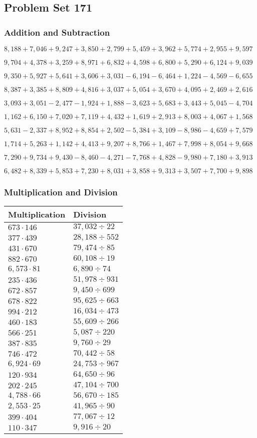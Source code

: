 \hypertarget{problem-set-171}{%
\subsection{Problem Set 171}\label{problem-set-171}}

\hypertarget{addition-and-subtraction}{%
\subsubsection{Addition and
Subtraction}\label{addition-and-subtraction}}

\(8,188+7,046+9,247+3,850+2,799+5,459+3,962+5,774+2,955+9,597\)

\(9,704+4,378+3,259+8,971+6,832+4,598+6,800+5,290+6,124+9,039\)

\(9,350+5,927+5,641+3,606+3,031-6,194-6,464+1,224-4,569-6,655\)

\(8,387+3,385+8,809+4,816+3,037+5,054+3,670+4,095+2,469+2,616\)

\(3,093+3,051-2,477-1,924+1,888-3,623+5,683+3,443+5,045-4,704\)

\(1,162+6,150+7,020+7,119+4,432+1,619+2,913+8,003+4,067+1,568\)

\(5,631-2,337+8,952+8,854+2,502-5,384+3,109-8,986-4,659+7,579\)

\(1,714+5,263+1,142+4,413+9,207+8,766+1,467+7,998+8,054+9,668\)

\(7,290+9,734+9,430-8,460-4,271-7,768+4,828-9,980+7,180+3,913\)

\(6,482+8,339+5,853+7,230+8,031+3,858+9,313+3,507+7,700+9,898\)

\hypertarget{multiplication-and-division}{%
\subsubsection{Multiplication and
Division}\label{multiplication-and-division}}

\begin{longtable}[]{@{}ll@{}}
\toprule
Multiplication & Division\tabularnewline
\midrule
\endhead
\(673\cdot146\) & \(37,032÷22\)\tabularnewline
\(377\cdot439\) & \(28,188÷552\)\tabularnewline
\(431\cdot670\) & \(79,474÷85\)\tabularnewline
\(882\cdot670\) & \(60,108÷19\)\tabularnewline
\(6,573\cdot81\) & \(6,890÷74\)\tabularnewline
\(235\cdot436\) & \(51,978÷931\)\tabularnewline
\(672\cdot857\) & \(9,450÷699\)\tabularnewline
\(678\cdot822\) & \(95,625÷663\)\tabularnewline
\(994\cdot212\) & \(16,034÷473\)\tabularnewline
\(460\cdot183\) & \(55,609÷266\)\tabularnewline
\(566\cdot251\) & \(5,087÷220\)\tabularnewline
\(387\cdot835\) & \(9,760÷29\)\tabularnewline
\(746\cdot472\) & \(70,442÷58\)\tabularnewline
\(6,924\cdot69\) & \(24,753÷967\)\tabularnewline
\(120\cdot934\) & \(64,650÷96\)\tabularnewline
\(202\cdot245\) & \(47,104÷700\)\tabularnewline
\(4,788\cdot66\) & \(56,670÷185\)\tabularnewline
\(2,553\cdot25\) & \(41,965÷90\)\tabularnewline
\(399\cdot404\) & \(77,067÷12\)\tabularnewline
\(110\cdot347\) & \(9,916÷20\)\tabularnewline
\bottomrule
\end{longtable}
